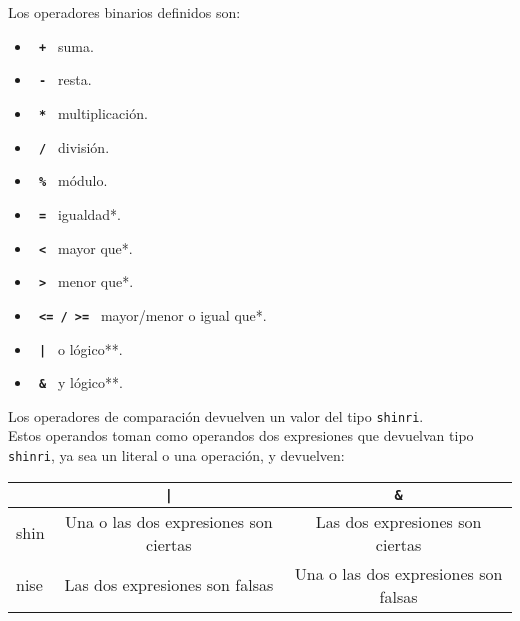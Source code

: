 \documentclass[spanish]{article}
\begin{document}
\newpage
Los operadores binarios definidos son:
\begin{itemize}
  \item{ \texttt{\textbf{ + }}\hspace{20pt} suma. }
  \item{ \texttt{\textbf{ - }}\hspace{20pt} resta. }
  \item{ \texttt{\textbf{ * }}\hspace{20pt} multiplicación. }
  \item{ \texttt{\textbf{ / }}\hspace{20pt} división. }
  \item{ \texttt{\textbf{ \% }}\hspace{20pt} módulo. }
  \item{ \texttt{\textbf{ = }}\hspace{20pt} igualdad*. }
  \item{ \texttt{\textbf{ < }}\hspace{20pt} mayor que*. }
  \item{ \texttt{\textbf{ > }}\hspace{20pt} menor que*. }
  \item{ \texttt{\textbf{ <= / >= }}\hspace{20pt} mayor/menor o igual que*. }
  \item{ \texttt{\textbf{ | }}\hspace{20pt} o lógico**. }
  \item{ \texttt{\textbf{ \& }}\hspace{20pt} y lógico**. }
\end{itemize}
\text{*}Los operadores de comparación devuelven un valor del tipo \texttt{shinri}.\\
\text{**}Estos operandos toman como operandos dos expresiones que devuelvan tipo \texttt{shinri}, ya sea un literal o una operación, y devuelven:\\

\begin{tabular}{ | l | c | c | }
  \hline
  & \texttt{ | } & \texttt{ \& } \\ \hline
  shin & Una o las dos expresiones son ciertas & Las dos expresiones son ciertas \\ \hline
  nise & Las dos expresiones son falsas & Una o las dos expresiones son falsas \\
  \hline
\end{tabular}
\end{document}
